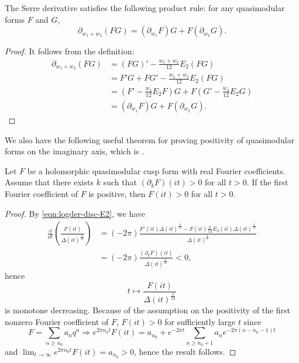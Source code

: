 \begin{theorem}\label{thm:serre-der-prod-rule}
The Serre derivative satisfies the following product rule: for any quasimodular forms $F$ and $G$,
\begin{equation}
    \partial_{w_1 + w_2} (FG) = (\partial_{w_1}F)G + F (\partial_{w_2}G).
\end{equation}
\end{theorem}
\begin{proof}
It follows from the definition:
\begin{align}
    \partial_{w_1 + w_2} (FG) &= (FG)' - \frac{w_1 + w_2}{12} E_2 (FG) \\
    &= F'G + FG' - \frac{w_1 + w_2}{12} E_2(FG) \\
    &= \left(F' - \frac{w_1}{12}E_2 F\right)G + F \left(G' - \frac{w_2}{12}E_2 G\right) \\
    &= (\partial_{w_1}F)G + F(\partial_{w_2}G).
\end{align}
\end{proof}

We also have the following useful theorem for proving positivity of quasimodular forms on the imaginary axis, which is \cite[Proposition 3.5, Corollary 3.6]{Lee}.
\begin{theorem}\label{thm:anti-serre-der-pos}
Let $F$ be a holomorphic quasimodular cusp form with real Fourier coefficients.
Assume that there exists $k$ such that $(\partial_{k}F)(it) > 0$ for all $t > 0$.
If the first Fourier coefficient of $F$ is positive, then $F(it) > 0$ for all $t > 0$.
\end{theorem}
\begin{proof}
By \eqref{eqn:logder-disc-E2}, we have
\begin{align}
    \frac{\dd}{\dd t} \left( \frac{F(it)}{\Delta(it)^{\frac{k}{12}}}\right)
    &= (-2 \pi) \frac{F'(it) \Delta(it)^{\frac{k}{12}} - F(it) \frac{k}{12} E_{2}(it) \Delta(it)^{\frac{k}{12}}}{\Delta(it)^{\frac{k}{6}}} \\
    &= (-2 \pi) \frac{(\partial_{k} F)(it)}{\Delta(it)^{\frac{k}{12}}}  < 0,
\end{align}
hence
\[
t \mapsto \frac{F(it)}{\Delta(it)^{\frac{k}{12}}}
\]
is monotone decreasing.
Because of the assumption on the positivity of the first nonzero Fourier coefficient of $F$, $F(it) > 0$ for sufficiently large $t$ since
\[
F = \sum_{n \geq n_{0}} a_{n} q^{n} \Rightarrow e^{2 \pi n_{0} t} F(it) = a_{n_{0}} + e^{-2 \pi t}\sum_{n\geq n_{0} + 1} a_{n} e^{-2 \pi (n - n_{0} - 1)t}
\]
and $\lim_{t \to \infty} e^{2 \pi n_{0}t} F(it) = a_{n_0} > 0$, hence the result follows.
\end{proof}


